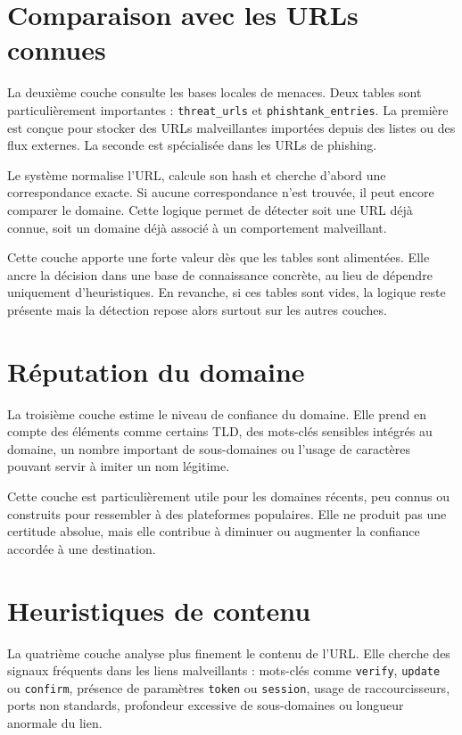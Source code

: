 ﻿\documentclass[12pt,a4paper]{report}
\begin{document}
\section{Comparaison avec les URLs connues}

La deuxième couche consulte les bases locales de menaces. Deux tables sont particulièrement importantes : \texttt{threat\_urls} et \texttt{phishtank\_entries}. La première est conçue pour stocker des URLs malveillantes importées depuis des listes ou des flux externes. La seconde est spécialisée dans les URLs de phishing.

Le système normalise l'URL, calcule son hash et cherche d'abord une correspondance exacte. Si aucune correspondance n'est trouvée, il peut encore comparer le domaine. Cette logique permet de détecter soit une URL déjà connue, soit un domaine déjà associé à un comportement malveillant.

Cette couche apporte une forte valeur dès que les tables sont alimentées. Elle ancre la décision dans une base de connaissance concrète, au lieu de dépendre uniquement d'heuristiques. En revanche, si ces tables sont vides, la logique reste présente mais la détection repose alors surtout sur les autres couches.

\section{Réputation du domaine}

La troisième couche estime le niveau de confiance du domaine. Elle prend en compte des éléments comme certains TLD, des mots-clés sensibles intégrés au domaine, un nombre important de sous-domaines ou l'usage de caractères pouvant servir à imiter un nom légitime.

Cette couche est particulièrement utile pour les domaines récents, peu connus ou construits pour ressembler à des plateformes populaires. Elle ne produit pas une certitude absolue, mais elle contribue à diminuer ou augmenter la confiance accordée à une destination.

\section{Heuristiques de contenu}

La quatrième couche analyse plus finement le contenu de l'URL. Elle cherche des signaux fréquents dans les liens malveillants : mots-clés comme \texttt{verify}, \texttt{update} ou \texttt{confirm}, présence de paramètres \texttt{token} ou \texttt{session}, usage de raccourcisseurs, ports non standards, profondeur excessive de sous-domaines ou longueur anormale du lien.
\end{document}
